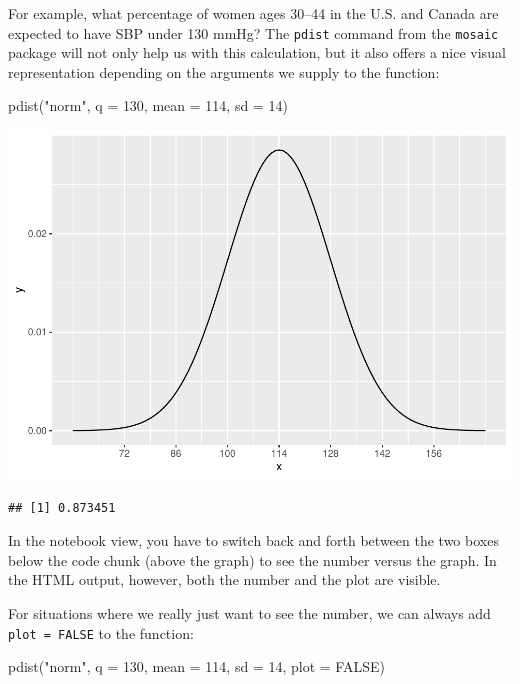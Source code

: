 \documentclass[
]{book}
\newenvironment{Shaded}{\begin{snugshade}}{\end{snugshade}}
\newcommand{\AttributeTok}[1]{\textcolor[rgb]{0.77,0.63,0.00}{#1}}
\newcommand{\ConstantTok}[1]{\textcolor[rgb]{0.00,0.00,0.00}{#1}}
\newcommand{\DecValTok}[1]{\textcolor[rgb]{0.00,0.00,0.81}{#1}}
\newcommand{\FunctionTok}[1]{\textcolor[rgb]{0.00,0.00,0.00}{#1}}
\newcommand{\NormalTok}[1]{#1}
\newcommand{\StringTok}[1]{\textcolor[rgb]{0.31,0.60,0.02}{#1}}
\begin{document}
For example, what percentage of women ages 30--44 in the U.S. and Canada are expected to have SBP under 130 mmHg? The \texttt{pdist} command from the \texttt{mosaic} package will not only help us with this calculation, but it also offers a nice visual representation depending on the arguments we supply to the function:

\begin{Shaded}
\begin{Highlighting}[]
\FunctionTok{pdist}\NormalTok{(}\StringTok{"norm"}\NormalTok{, }\AttributeTok{q =} \DecValTok{130}\NormalTok{, }\AttributeTok{mean =} \DecValTok{114}\NormalTok{, }\AttributeTok{sd =} \DecValTok{14}\NormalTok{)}
\end{Highlighting}
\end{Shaded}

\includegraphics{intro_stats_files/figure-latex/unnamed-chunk-338-1.pdf}

\begin{verbatim}
## [1] 0.873451
\end{verbatim}

In the notebook view, you have to switch back and forth between the two boxes below the code chunk (above the graph) to see the number versus the graph. In the HTML output, however, both the number and the plot are visible.

For situations where we really just want to see the number, we can always add \texttt{plot\ =\ FALSE} to the function:

\begin{Shaded}
\begin{Highlighting}[]
\FunctionTok{pdist}\NormalTok{(}\StringTok{"norm"}\NormalTok{, }\AttributeTok{q =} \DecValTok{130}\NormalTok{, }\AttributeTok{mean =} \DecValTok{114}\NormalTok{, }\AttributeTok{sd =} \DecValTok{14}\NormalTok{, }\AttributeTok{plot =} \ConstantTok{FALSE}\NormalTok{)}
\end{Highlighting}
\end{Shaded}
\end{document}
